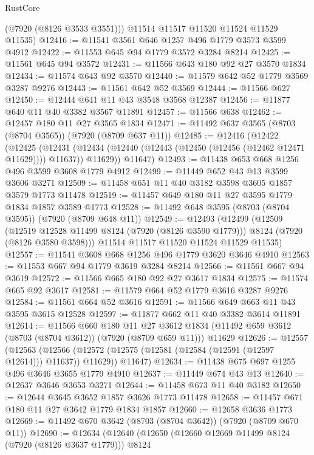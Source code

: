 \begin{lexlean}{RustCore}
\begin{coremodule}
        (@7920 (@8126 @3533 @3551)))
      @11514
      @11517
      @11520
      @11524
      @11529
      @11535)
@12416 := @11541 @3561 @646 @1257 @496 @1779 @3573 @3599 @4912
@12422 := @11553 @645 @94 @1779 @3572 @3284 @8214
@12425 := @11561 @645 @94 @3572
@12431 := @11566 @643 @180 @92 @27 @3570 @1834
@12434 := @11574 @643 @92 @3570
@12440 := @11579 @642 @52 @1779 @3569 @3287 @9276
@12443 := @11561 @642 @52 @3569
@12444 := @11566 @627
@12450 := @12444 @641 @11 @43 @3548 @3568 @12387
@12456 := @11877 @640 @11 @40 @3382 @3567 @11891
@12457 := @11566 @638
@12462 := @12457 @180 @11 @27 @3565 @1834
@12471 := @11492 @637 @3565 (@8703 (@8704 @3565)) (@7920 (@8709 @637 @11))
@12485 := @12416
    (@12422
      (@12425
        (@12431 (@12434 (@12440 (@12443 (@12450 (@12456 (@12462 @12471 @11629)))) @11637)) @11629))
      @11647)
@12493 := @11438 @653 @668 @1256 @496 @3599 @3608 @1779 @4912
@12499 := @11449 @652 @43 @13 @3599 @3606 @3271
@12509 := @11458 @651 @11 @40 @3182 @3598 @3605 @1857 @3579 @1773 @11478
@12519 := @11457 @649 @180 @11 @27 @3595 @1779 @1834 @1857 @3589 @1773
@12528 := @11492 @648 @3595 (@8703 (@8704 @3595)) (@7920 (@8709 @648 @11))
@12549 := @12493
    (@12499
      (@12509
        (@12519 @12528 @11499 @8124 (@7920 (@8126 @3590 @1779)))
        @8124
        (@7920 (@8126 @3580 @3598)))
      @11514
      @11517
      @11520
      @11524
      @11529
      @11535)
@12557 := @11541 @3608 @668 @1256 @496 @1779 @3620 @3646 @4910
@12563 := @11553 @667 @94 @1779 @3619 @3284 @8214
@12566 := @11561 @667 @94 @3619
@12572 := @11566 @665 @180 @92 @27 @3617 @1834
@12575 := @11574 @665 @92 @3617
@12581 := @11579 @664 @52 @1779 @3616 @3287 @9276
@12584 := @11561 @664 @52 @3616
@12591 := @11566 @649 @663 @11 @43 @3595 @3615 @12528
@12597 := @11877 @662 @11 @40 @3382 @3614 @11891
@12614 := @11566
    @660
    @180
    @11
    @27
    @3612
    @1834
    (@11492 @659 @3612 (@8703 (@8704 @3612)) (@7920 (@8709 @659 @11)))
    @11629
@12626 := @12557
    (@12563
      (@12566 (@12572 (@12575 (@12581 (@12584 (@12591 (@12597 @12614))) @11637)) @11629))
      @11647)
@12634 := @11438 @675 @697 @1255 @496 @3646 @3655 @1779 @4910
@12637 := @11449 @674 @43 @13
@12640 := @12637 @3646 @3653 @3271
@12644 := @11458 @673 @11 @40 @3182
@12650 := @12644 @3645 @3652 @1857 @3626 @1773 @11478
@12658 := @11457 @671 @180 @11 @27 @3642 @1779 @1834 @1857
@12660 := @12658 @3636 @1773
@12669 := @11492 @670 @3642 (@8703 (@8704 @3642)) (@7920 (@8709 @670 @11))
@12690 := @12634
    (@12640
      (@12650
        (@12660 @12669 @11499 @8124 (@7920 (@8126 @3637 @1779)))
        @8124

\end{coremodule}
\end{lexlean}
